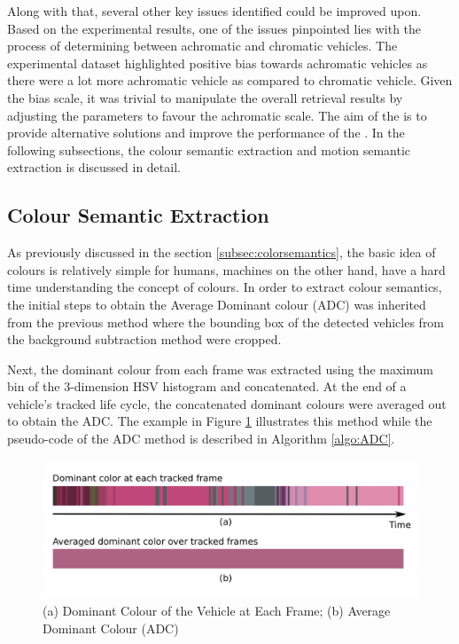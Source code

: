 Along with that, several other key issues identified could be improved upon.
Based on the experimental results, one of the issues pinpointed lies with the process of determining between achromatic and chromatic vehicles.
The experimental dataset highlighted positive bias towards achromatic vehicles as there were a lot more achromatic vehicle as compared to chromatic vehicle.
Given the bias scale, it was trivial to manipulate the overall retrieval results by adjusting the parameters to favour the achromatic scale.
The aim of the \versionTwoExt is to provide alternative solutions and improve the performance of the \versionOneExt. In the following subsections, the colour semantic extraction and motion semantic extraction is discussed in detail.


\subsection{Colour Semantic Extraction}
\label{section:versiontwoColor}
As previously discussed in the section \ref{subsec:colorsemantics}, the basic idea of colours is relatively simple for humans, machines on the other hand, have a hard time understanding the concept of colours. In order to extract colour semantics, the initial steps to obtain the Average Dominant colour (ADC) was inherited from the previous method where the bounding box of the detected vehicles from the background subtraction method were cropped.

Next, the dominant colour from each frame was extracted using the maximum bin of the 3-dimension HSV histogram and concatenated. At the end of a vehicle's tracked life cycle, the concatenated dominant colours were averaged out to obtain the ADC. The example in Figure \ref{fig:ADC} illustrates this method while the pseudo-code of the ADC method is described in Algorithm \ref{algo:ADC}.

\begin{figure}[hbt!]\centering
\includegraphics[width=.9\textwidth]{image/general/ADC.png}
\caption{(a) Dominant Colour of the Vehicle at Each Frame; (b) Average Dominant Colour (ADC)}
\label{fig:ADC}
\end{figure}

